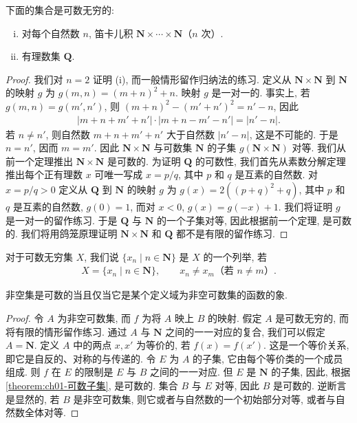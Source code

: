 \documentclass[../../main.tex]{subfiles}
\begin{document}
\begin{corollary}\label{corollary:ch01-可数推论}
下面的集合是可数无穷的:
\begin{enumerate}[(i)]
\item 对每个自然数 $n$, 笛卡儿积 $\mathbf{N}\times\cdots\times\mathbf{N}$（$n$ 次）.
\item 有理数集 $\mathbf{Q}$.
\end{enumerate}
\end{corollary}

\begin{proof}
我们对 $n=2$ 证明 (i), 而一般情形留作归纳法的练习. 定义从 $\mathbf{N}\times\mathbf{N}$ 到 $\mathbf{N}$ 的映射 $g$ 为 $g(m,n)=(m+n)^{2}+n$. 映射 $g$ 是一对一的. 事实上, 若 $g(m,n)=g(m',n')$, 则 $(m+n)^{2}-(m'+n')^{2}=n'-n$, 因此
\begin{align*}
|m+n+m'+n'|\cdot|m+n-m'-n'|=|n'-n|.
\end{align*}
若 $n\neq n'$, 则自然数 $m+n+m'+n'$ 大于自然数 $|n'-n|$, 这是不可能的. 于是 $n=n'$, 因而 $m=m'$. 因此 $\mathbf{N}\times\mathbf{N}$ 与可数集 $\mathbf{N}$ 的子集 $g(\mathbf{N}\times\mathbf{N})$ 对等. 我们从前一个定理推出 $\mathbf{N}\times\mathbf{N}$ 是可数的. 为证明 $\mathbf{Q}$ 的可数性, 我们首先从素数分解定理推出每个正有理数 $x$ 可唯一写成 $x=p/q$, 其中 $p$ 和 $q$ 是互素的自然数. 对 $x=p/q>0$ 定义从 $\mathbf{Q}$ 到 $\mathbf{N}$ 的映射 $g$ 为 $g(x)=2((p+q)^{2}+q)$, 其中 $p$ 和 $q$ 是互素的自然数, $g(0)=1$, 而对 $x<0$, $g(x)=g(-x)+1$. 我们将证明 $g$ 是一对一的留作练习. 于是 $\mathbf{Q}$ 与 $\mathbf{N}$ 的一个子集对等, 因此根据前一个定理, 是可数的. 我们将用鸽笼原理证明 $\mathbf{N}\times\mathbf{N}$ 和 $\mathbf{Q}$ 都不是有限的留作练习.
\end{proof}

对于可数无穷集 $X$, 我们说 $\{x_{n}\mid n\in\mathbf{N}\}$ 是 $X$ 的一个列举, 若
\begin{align*}
X=\{x_{n}\mid n\in\mathbf{N}\},\qquad x_{n}\neq x_{m}\text{（若 }n\neq m\text{）}.
\end{align*}

\begin{theorem}\label{theorem:ch01-可数象}
非空集是可数的当且仅当它是某个定义域为非空可数集的函数的象.
\end{theorem}

\begin{proof}
令 $A$ 为非空可数集, 而 $f$ 为将 $A$ 映上 $B$ 的映射. 假定 $A$ 是可数无穷的, 而将有限的情形留作练习. 通过 $A$ 与 $\mathbf{N}$ 之间的一一对应的复合, 我们可以假定 $A=\mathbf{N}$. 定义 $A$ 中的两点 $x,x'$ 为等价的, 若 $f(x)=f(x')$. 这是一个等价关系, 即它是自反的、对称的与传递的. 令 $E$ 为 $A$ 的子集, 它由每个等价类的一个成员组成. 则 $f$ 在 $E$ 的限制是 $E$ 与 $B$ 之间的一一对应. 但 $E$ 是 $\mathbf{N}$ 的子集, 因此, 根据\cref{theorem:ch01-可数子集}, 是可数的. 集合 $B$ 与 $E$ 对等, 因此 $B$ 是可数的. 逆断言是显然的, 若 $B$ 是非空可数集, 则它或者与自然数的一个初始部分对等, 或者与自然数全体对等.
\end{proof}
\end{document}
